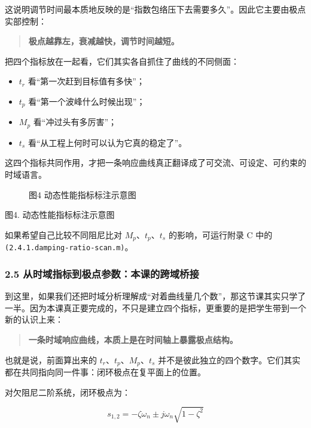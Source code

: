 \documentclass[
  11pt]{article}
\providecommand{\tightlist}{%
  \setlength{\itemsep}{0pt}\setlength{\parskip}{0pt}}
\begin{document}
这说明调节时间最本质地反映的是``指数包络压下去需要多久''。因此它主要由极点实部控制：

\begin{quote}
\textbf{极点越靠左，衰减越快，调节时间越短。}
\end{quote}

把四个指标放在一起看，它们其实各自抓住了曲线的不同侧面：

\begin{itemize}
\tightlist
\item
  \(t_r\) 看``第一次赶到目标值有多快''；
\item
  \(t_p\) 看``第一个波峰什么时候出现''；
\item
  \(M_p\) 看``冲过头有多厉害''；
\item
  \(t_s\) 看``从工程上何时可以认为它真的稳定了''。
\end{itemize}

这四个指标共同作用，才把一条响应曲线真正翻译成了可交流、可设定、可约束的时域语言。

\begin{figure}
\centering

\caption{图4 动态性能指标标注示意图}
\end{figure}

图4. 动态性能指标标注示意图

如果希望自己比较不同阻尼比对 \(M_p\)、\(t_p\)、\(t_s\)
的影响，可运行附录 C 中的 \texttt{(2.4.1.damping-ratio-scan.m)}。

\subsubsection{2.5
从时域指标到极点参数：本课的跨域桥接}\label{ux4eceux65f6ux57dfux6307ux6807ux5230ux6781ux70b9ux53c2ux6570ux672cux8bfeux7684ux8de8ux57dfux6865ux63a5}

到这里，如果我们还把时域分析理解成``对着曲线量几个数''，那这节课其实只学了一半。因为本课真正要完成的，不只是建立四个指标，更重要的是把学生带到一个新的认识上来：

\begin{quote}
\textbf{一条时域响应曲线，本质上是在时间轴上暴露极点结构。}
\end{quote}

也就是说，前面算出来的 \(t_r\)、\(t_p\)、\(M_p\)、\(t_s\)
并不是彼此独立的四个数字。它们其实都在共同指向同一件事：闭环极点在复平面上的位置。

对欠阻尼二阶系统，闭环极点为：

\[
s_{1,2} = -\zeta\omega_n \pm j\omega_n\sqrt{1-\zeta^2}
\]
\end{document}
